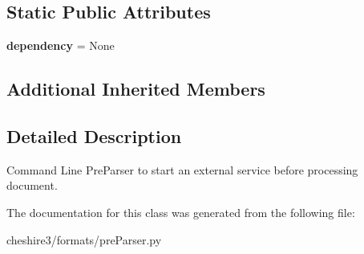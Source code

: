\subsection*{Static Public Attributes}
\begin{DoxyCompactItemize}
\item 
\hypertarget{classcheshire3_1_1formats_1_1pre_parser_1_1_dependent_cmd_line_pre_parser_ac86d7f7f051ae5196f86f7f226c30f13}{{\bfseries dependency} = None}\label{classcheshire3_1_1formats_1_1pre_parser_1_1_dependent_cmd_line_pre_parser_ac86d7f7f051ae5196f86f7f226c30f13}

\end{DoxyCompactItemize}
\subsection*{Additional Inherited Members}


\subsection{Detailed Description}
\begin{DoxyVerb}Command Line PreParser to start an external service before processing document.\end{DoxyVerb}
 

The documentation for this class was generated from the following file\-:\begin{DoxyCompactItemize}
\item 
cheshire3/formats/pre\-Parser.\-py\end{DoxyCompactItemize}
